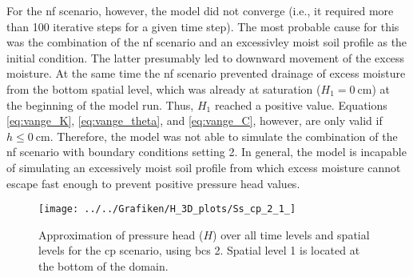 For the nf scenario, however, the model did not converge (i.e., it required more than \SI{100}{} iterative steps for a given time step).  The most probable cause for this was the combination of the nf scenario and an excessivley moist soil profile as the initial condition.  The latter presumably led to downward movement of the excess moisture.  At the same time the nf scenario prevented drainage of excess moisture from the bottom spatial level, which was already at saturation ($H_1 = \SI{0}{\centi\meter}$) at the beginning of the model run.  Thus, $H_1$ reached a positive value.  Equations \eqref{eq:vange_K}, \eqref{eq:vange_theta}, and \eqref{eq:vange_C}, however, are only valid if $h \leq \SI{0}{\centi\meter}$.  Therefore, the model was not able to simulate the combination of the nf scenario with boundary conditions setting 2.  In general, the model is incapable of simulating an excessively moist soil profile from which excess moisture cannot escape fast enough to prevent positive pressure head values.

\begin{figure}[H]
  \centering
  \texttt{[image: ../../Grafiken/H\_3D\_plots/Ss\_cp\_2\_1\_]}
  \caption{Approximation of pressure head ($H$) over all time levels and spatial levels for the cp scenario, using bcs 2.  Spatial level 1 is located at the bottom of the domain.}
  \label{fig:cp2}
\end{figure}

